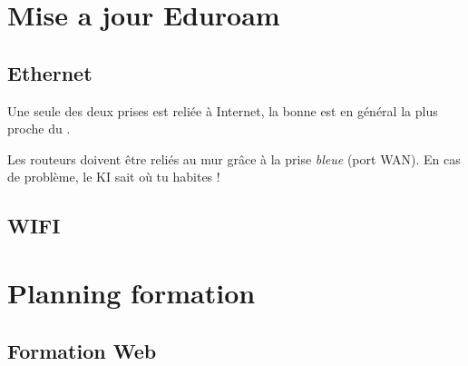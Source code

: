 \documentclass{ki019}
\begin{document}
\section{Mise a jour Eduroam}

\subsection{Ethernet}

\Footer{\today}
\lipsum[1-2]

\begin{kiframe}
    Une seule des deux prises  est reliée à Internet, la bonne est en général la plus proche du .

    Les routeurs doivent être reliés au mur grâce à la prise \emph{bleue} (port WAN). En cas de problème, le KI sait où tu habites !
\end{kiframe}

\lipsum[1]

\subsection{WIFI}

\lipsum[1]

\section{Planning formation}

\subsection{Formation Web}

\Footer{\today}
\lipsum[1-3]
\end{document}

